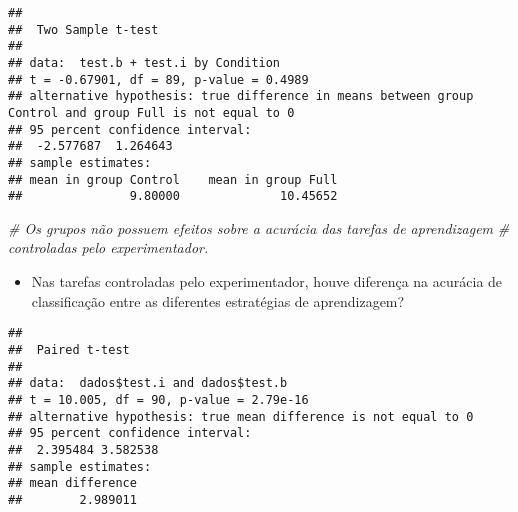 \documentclass[
]{article}
\newenvironment{Shaded}{\begin{snugshade}}{\end{snugshade}}
\newcommand{\AttributeTok}[1]{\textcolor[rgb]{0.13,0.29,0.53}{#1}}
\newcommand{\CommentTok}[1]{\textcolor[rgb]{0.56,0.35,0.01}{\textit{#1}}}
\newcommand{\ConstantTok}[1]{\textcolor[rgb]{0.56,0.35,0.01}{#1}}
\newcommand{\FunctionTok}[1]{\textcolor[rgb]{0.13,0.29,0.53}{\textbf{#1}}}
\newcommand{\NormalTok}[1]{#1}
\newcommand{\OtherTok}[1]{\textcolor[rgb]{0.56,0.35,0.01}{#1}}
\newcommand{\SpecialCharTok}[1]{\textcolor[rgb]{0.81,0.36,0.00}{\textbf{#1}}}
\providecommand{\tightlist}{%
  \setlength{\itemsep}{0pt}\setlength{\parskip}{0pt}}
\begin{document}
\begin{verbatim}
## 
##  Two Sample t-test
## 
## data:  test.b + test.i by Condition
## t = -0.67901, df = 89, p-value = 0.4989
## alternative hypothesis: true difference in means between group Control and group Full is not equal to 0
## 95 percent confidence interval:
##  -2.577687  1.264643
## sample estimates:
## mean in group Control    mean in group Full 
##               9.80000              10.45652
\end{verbatim}

\begin{Shaded}
\begin{Highlighting}[]
\CommentTok{\# Os grupos não possuem efeitos sobre a acurácia das tarefas de aprendizagem}
\CommentTok{\# controladas pelo experimentador.}
\end{Highlighting}
\end{Shaded}

\begin{itemize}
\tightlist
\item
  Nas tarefas controladas pelo experimentador, houve diferença na
  acurácia de classificação entre as diferentes estratégias de
  aprendizagem?
\end{itemize}

\begin{Shaded}
\end{Shaded}

\begin{verbatim}
## 
##  Paired t-test
## 
## data:  dados$test.i and dados$test.b
## t = 10.005, df = 90, p-value = 2.79e-16
## alternative hypothesis: true mean difference is not equal to 0
## 95 percent confidence interval:
##  2.395484 3.582538
## sample estimates:
## mean difference 
##        2.989011
\end{verbatim}
\end{document}
